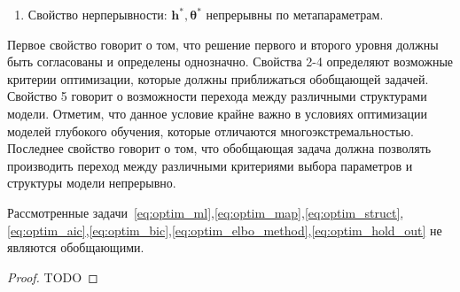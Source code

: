 \begin{defin}
\begin{enumerate}
\item Свойство нерперывности: $\mathbf{h}^{*}, \boldsymbol{\theta}^{*}$ непрерывны по метапараметрам.
\end{enumerate}
\end{defin}
Первое свойство говорит о том, что решение первого и второго уровня должны быть согласованы и определены однозначно.
Свойства 2-4 определяют возможные критерии оптимизации, которые должны приближаться обобщающей задачей.
Свойство 5 говорит о возможности перехода между различными структурами модели. Отметим, что данное условие крайне важно в условиях оптимизации моделей глубокого обучения, которые отличаются многоэкстремальностью.
Последнее свойство говорит о том, что обобщающая задача должна позволять производить переход между различными критериями выбора  параметров и структуры модели непрерывно.

\begin{theorem}Рассмотренные задачи~\eqref{eq:optim_ml},\eqref{eq:optim_map},\eqref{eq:optim_struct},\eqref{eq:optim_aic},\eqref{eq:optim_bic},\eqref{eq:optim_elbo_method},\eqref{eq:optim_hold_out} не являются обобщающими.
\end{theorem}
\begin{proof}
TODO
\end{proof}

